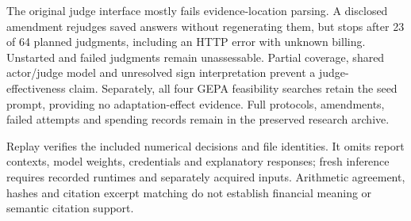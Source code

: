 The original judge interface mostly fails evidence-location parsing. A disclosed amendment rejudges saved answers without regenerating them, but stops after 23 of 64 planned judgments, including an HTTP error with unknown billing. Unstarted and failed judgments remain unassessable. Partial coverage, shared actor/judge model and unresolved sign interpretation prevent a judge-effectiveness claim. Separately, all four GEPA feasibility searches retain the seed prompt, providing no adaptation-effect evidence. Full protocols, amendments, failed attempts and spending records remain in the preserved research archive.

Replay verifies the included numerical decisions and file identities. It omits report contexts, model weights, credentials and explanatory responses; fresh inference requires recorded runtimes and separately acquired inputs. Arithmetic agreement, hashes and citation excerpt matching do not establish financial meaning or semantic citation support.



